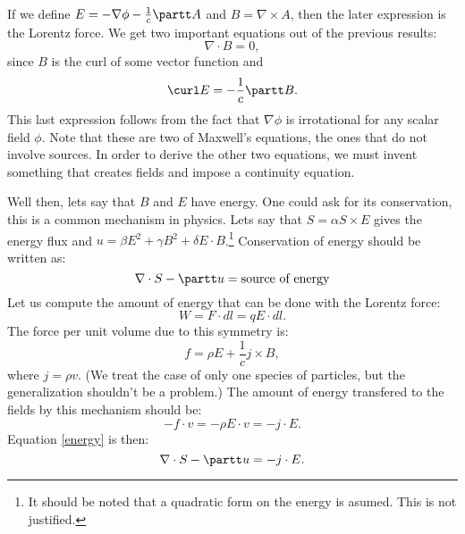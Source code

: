 \documentclass[letterpaper,10pt]{article}
\begin{document}
If we define $E=-\nabla\phi - \frac{1}{c}\partt A$ and $B = \nabla\times A$, then the later expression is the Lorentz force. We get two important equations out of the previous results:
\begin{equation}
\nabla\cdot B = 0,
\end{equation}
since $B$ is the curl of some vector function and
\begin{equation}
\curl E = -\frac{1}{c}\partt B.
\end{equation}
This last expression follows from the fact that $\nabla \phi$ is irrotational for any scalar field $\phi$. Note that these are two of Maxwell's equations, the ones that do not involve sources. In order to derive the other two equations, we must invent something that creates fields and impose a continuity equation.

Well then, lets say that $B$ and $E$ have energy. One could ask for its conservation, this is a common mechanism in physics. Lets say that $S=\alpha S\times E$ gives the energy flux and $u = \beta E^2 + \gamma B^2 + \delta E\cdot B$.\footnote{It should be noted that a quadratic form on the energy is asumed. This is not justified.} Conservation of energy should be written as:
\begin{equation}
\nabla\cdot S - \partt u = \text{source of energy}\label{energy}
\end{equation}
Let us compute the amount of energy that can be done with the Lorentz force:
\begin{equation}
W =  F\cdot dl = q E\cdot dl.
\end{equation}
The force per unit volume due to this symmetry is:
\begin{equation}
f = \rho E + \frac{1}{c}j\times B,
\end{equation}
where $j=\rho v$. (We treat the case of only one species of particles, but the generalization shouldn't be a problem.)
The amount of energy transfered to the fields by this mechanism should be:
\begin{equation}
-f\cdot v = -\rho E\cdot v = -j\cdot E.
\end{equation}
Equation \eqref{energy} is then:
\begin{equation}
\nabla \cdot S - \partt u = -j\cdot E.
\end{equation}
\end{document}
